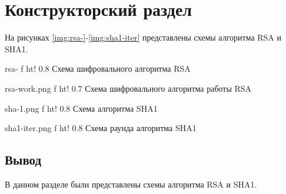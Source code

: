 \chapter{Конструкторский раздел}

На рисунках \ref{img:rsa-}-\ref{img:sha1-iter} представлены схемы алгоритма RSA и SHA1.

{rsa-} %
{f} %
{ht!} %
{0.8\textwidth} %
{Схема шифровального алгоритма RSA} %

{rsa-work.png} %
{f} %
{ht!} %
{0.7\textwidth} %
{Схема шифровального алгоритма работы RSA} %

{sha-1.png} %
{f} %
{ht!} %
{0.8\textwidth} %
{Схема алгоритма SHA1} %

{sha1-iter.png} %
{f} %
{ht!} %
{0.8\textwidth} %
{Схема раунда алгоритма SHA1} %

\section*{Вывод}

В данном разделе были представлены схемы алгоритма RSA и SHA1.





